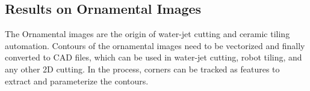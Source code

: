 \documentclass[letterpaper, 10 pt, conference]{ieeeconf}  %
\begin{document}
\begin{table}[h]
\renewcommand\arraystretch{1.5}
\caption{Evaluation results for the “Blocks” image}
\label{evaluation table}
\begin{center}
\end{center}
\end{table}

\subsection{Results on Ornamental Images}
The Ornamental images are the origin of water-jet cutting and ceramic tiling automation. Contours of the ornamental images need to be vectorized and finally converted to CAD files, which can be used in water-jet cutting, robot tiling, and any other 2D cutting. In the process, corners can be tracked as features to extract and parameterize the contours. 
\end{document}

